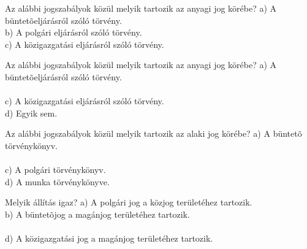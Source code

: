 \begin{frame}

\begin{tcolorbox}[title={9. Kérdés}]
Az alábbi jogszabályok közül melyik tartozik az anyagi jog körébe?
\tcblower
a) A büntetõeljárásról szóló törvény.\\
b) A polgári eljárásról szóló törvény.\\
c) A közigazgatási eljárásról szóló törvény.\\
\end{tcolorbox}

\begin{tcolorbox}[title={10. Kérdés}]
Az alábbi jogszabályok közül melyik tartozik az anyagi jog körébe?
\tcblower
a) A büntetõeljárásról szóló törvény.\\
\\
c) A közigazgatási eljárásról szóló törvény.\\
d) Egyik sem.
\end{tcolorbox}

\begin{tcolorbox}[title={11. Kérdés}]
Az alábbi jogszabályok közül melyik tartozik az alaki jog körébe?
\tcblower
a) A büntetõ törvénykönyv.\\
\\
c) A polgári törvénykönyv.\\
d) A munka törvénykönyve.
\end{tcolorbox}

\begin{tcolorbox}[title={12. Kérdés}]
Melyik állítás igaz?
\tcblower
a) A polgári jog a közjog területéhez tartozik.\\
b) A büntetõjog a magánjog területéhez tartozik.\\
\\
d) A közigazgatási jog a magánjog területéhez tartozik.
\end{tcolorbox}

\end{frame}


